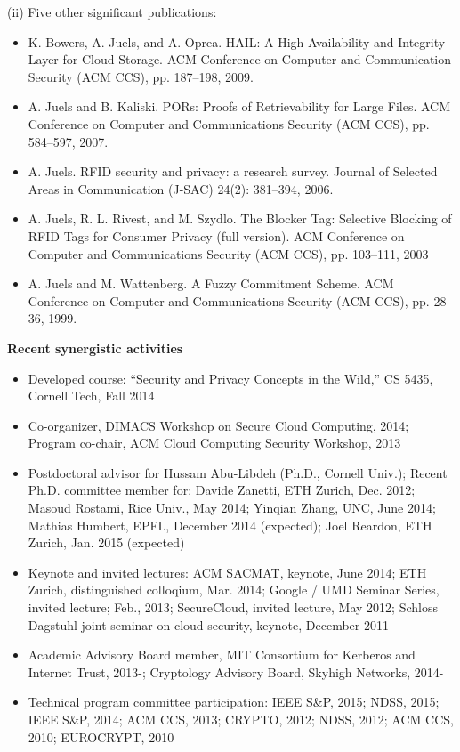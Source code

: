 \documentclass[11pt]{article}
\begin{document}
\pagebreak

\noindent (ii) Five other significant publications:
\vspace{-1mm}
\begin{itemize}
\item K. Bowers, A. Juels, and A. Oprea. {HAIL}: A High-Availability and Integrity Layer for Cloud Storage. ACM Conference on Computer and Communication Security (ACM CCS), pp. 187--198, 2009. 
\item A. Juels and B. Kaliski. PORs: Proofs of Retrievability for Large Files. ACM Conference on Computer and Communications Security (ACM CCS), pp. 584--597, 2007.
\item A. Juels.  RFID security and privacy: a research survey. Journal of Selected Areas in Communication (J-SAC) 24(2): 381--394, 2006.
\item A. Juels, R. L. Rivest, and M. Szydlo. The Blocker Tag: Selective Blocking of RFID Tags for Consumer Privacy (full version). ACM Conference on Computer and Communications Security (ACM CCS), pp. 103--111, 2003
\item A. Juels and M. Wattenberg. A Fuzzy Commitment Scheme. ACM Conference on Computer and Communications Security (ACM CCS), pp. 28--36, 1999. 
\end{itemize}

\bigskip
\vspace{-1mm}

\noindent
{\Large {\bf Recent synergistic activities}}

\begin{itemize}
\item Developed course: ``Security and Privacy Concepts in the Wild,'' CS 5435, Cornell Tech, Fall 2014
\item Co-organizer, DIMACS Workshop on Secure Cloud Computing, 2014;  Program co-chair, ACM Cloud Computing Security Workshop, 2013 
\item Postdoctoral advisor for Hussam Abu-Libdeh (Ph.D., Cornell Univ.); Recent Ph.D. committee member for: Davide Zanetti, ETH Zurich, Dec. 2012; Masoud Rostami, Rice Univ., May 2014; Yinqian Zhang, UNC, June 2014; Mathias Humbert, EPFL, December 2014 (expected); Joel Reardon, ETH Zurich, Jan. 2015 (expected)
\item Keynote and invited lectures: ACM SACMAT, keynote, June 2014; ETH Zurich, distinguished colloqium, Mar. 2014; Google / UMD Seminar Series, invited lecture; Feb., 2013; SecureCloud, invited lecture, May 2012; Schloss Dagstuhl joint seminar on cloud security, keynote, December 2011
\item Academic Advisory Board member, MIT Consortium for Kerberos and Internet Trust, 2013-; Cryptology Advisory Board, Skyhigh Networks, 2014-
\item Technical program committee participation: IEEE S\&P, 2015; NDSS, 2015; IEEE S\&P, 2014; ACM CCS, 2013; CRYPTO, 2012; NDSS, 2012; ACM CCS, 2010; EUROCRYPT, 2010
\end{itemize}
\end{document}
